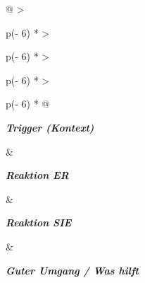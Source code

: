 \begin{longtable}[]{@{}
  >{\raggedright\arraybackslash}p{(\columnwidth - 6\tabcolsep) * }
  >{\raggedright\arraybackslash}p{(\columnwidth - 6\tabcolsep) * }
  >{\raggedright\arraybackslash}p{(\columnwidth - 6\tabcolsep) * }
  >{\raggedright\arraybackslash}p{(\columnwidth - 6\tabcolsep) * }@{}}
\toprule\noalign{}
\begin{minipage}[b]{\linewidth}\raggedright
\emph{\textbf{Trigger (Kontext)}}
\end{minipage} \& \begin{minipage}[b]{\linewidth}\raggedright
\emph{\textbf{Reaktion ER}}
\end{minipage} \& \begin{minipage}[b]{\linewidth}\raggedright
\emph{\textbf{Reaktion SIE}}
\end{minipage} \& \begin{minipage}[b]{\linewidth}\raggedright
\emph{\textbf{Guter Umgang / Was hilft}}
\end{minipage} \\
\midrule\noalign{}
\endhead
\bottomrule\noalign{}
\endlastfoot

\end{longtable}

